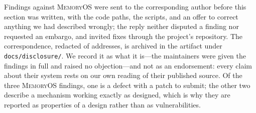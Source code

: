 Findings against \textsc{MemoryOS} were sent to the corresponding author
before this section was written, with the code paths, the scripts, and an
offer to correct anything we had described wrongly; the reply neither
disputed a finding nor requested an embargo, and invited fixes through
the project's repository. The correspondence, redacted of addresses, is
archived in the artifact under \texttt{docs/disclosure/}. We record it as
what it is---the maintainers were given the findings in full and raised
no objection---and not as an endorsement: every claim about their system
rests on our own reading of their published source. Of the three
\textsc{MemoryOS} findings, one is a defect with a patch to submit; the
other two describe a mechanism working exactly as designed, which is why
they are reported as properties of a design rather than as
vulnerabilities.

